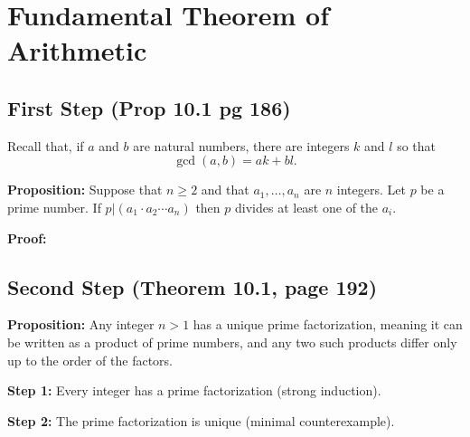 \documentclass[
]{article}
\author{}
\date{}
\begin{document}
\hypertarget{fundamental-theorem-of-arithmetic}{%
\section{Fundamental Theorem of
Arithmetic}\label{fundamental-theorem-of-arithmetic}}

\hypertarget{first-step-prop-10.1-pg-186}{%
\subsection{First Step (Prop 10.1 pg
186)}\label{first-step-prop-10.1-pg-186}}

Recall that, if \(a\) and \(b\) are natural numbers, there are integers
\(k\) and \(l\) so that \[
\gcd(a,b) = ak+bl.
\]

\textbf{Proposition:} Suppose that \(n\ge 2\) and that
\(a_1,\ldots, a_n\) are \(n\) integers. Let \(p\) be a prime number. If
\(p|(a_1\cdot a_2\cdots a_n)\) then \(p\) divides at least one of the
\(a_i\).

\textbf{Proof:}

\vfill\eject

\hypertarget{second-step-theorem-10.1-page-192}{%
\subsection{Second Step (Theorem 10.1, page
192)}\label{second-step-theorem-10.1-page-192}}

\textbf{Proposition:} Any integer \(n>1\) has a unique prime
factorization, meaning it can be written as a product of prime numbers,
and any two such products differ only up to the order of the factors.

\textbf{Step 1:} Every integer has a prime factorization (strong
induction). \vfill\eject

\textbf{Step 2:} The prime factorization is unique (minimal
counterexample).
\end{document}
